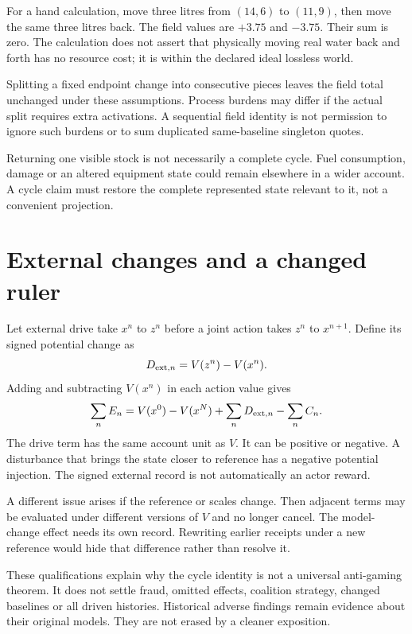 For a hand calculation, move three litres from $(14,6)$ to $(11,9)$, then move the same three litres back. The field values are $+3.75$ and $-3.75$. Their sum is zero. The calculation does not assert that physically moving real water back and forth has no resource cost; it is within the declared ideal lossless world.

Splitting a fixed endpoint change into consecutive pieces leaves the field total unchanged under these assumptions. Process burdens may differ if the actual split requires extra activations. A sequential field identity is not permission to ignore such burdens or to sum duplicated same-baseline singleton quotes.

Returning one visible stock is not necessarily a complete cycle. Fuel consumption, damage or an altered equipment state could remain elsewhere in a wider account. A cycle claim must restore the complete represented state relevant to it, not a convenient projection.

\section{External changes and a changed ruler}
Let external drive take $x^n$ to $z^n$ before a joint action takes $z^n$ to $x^{n+1}$. Define its signed potential change as
\begin{equation*}
 D_{{\rm ext},n}=V(z^n)-V(x^n).
\end{equation*}
Adding and subtracting $V(x^n)$ in each action value gives
\begin{equation}\label{eq:driven}
 \sum_n E_n=V(x^0)-V(x^N)
 +\sum_n D_{{\rm ext},n}-\sum_n C_n.
\end{equation}
The drive term has the same account unit as $V$. It can be positive or negative. A disturbance that brings the state closer to reference has a negative potential injection. The signed external record is not automatically an actor reward.\cite{foundation}

A different issue arises if the reference or scales change. Then adjacent terms may be evaluated under different versions of $V$ and no longer cancel. The model-change effect needs its own record. Rewriting earlier receipts under a new reference would hide that difference rather than resolve it.

These qualifications explain why the cycle identity is not a universal anti-gaming theorem. It does not settle fraud, omitted effects, coalition strategy, changed baselines or all driven histories. Historical adverse findings remain evidence about their original models. They are not erased by a cleaner exposition.

